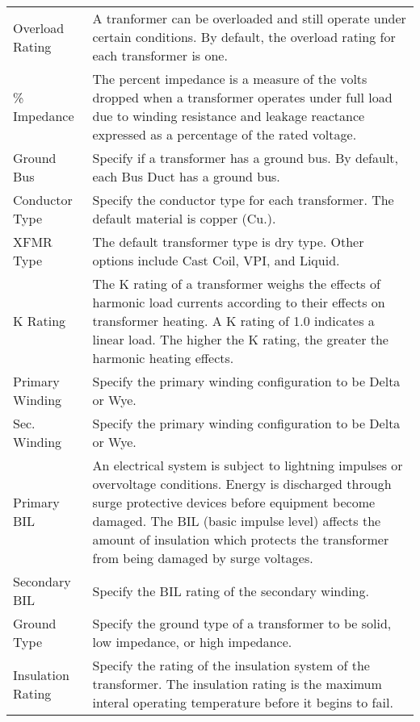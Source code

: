 \documentclass[letterpaper,10pt,english]{sphinxmanual}
\begin{document}
\begin{savenotes}\sphinxattablestart
\centering
\begin{tabulary}{\linewidth}[t]{|T|T|}
\hline
\sphinxstyletheadfamily 
{}
&\sphinxstyletheadfamily 
{}
\\
\hline
Overload Rating
&
A tranformer can be overloaded and still operate under certain conditions. By default, the overload rating for each transformer is one.
\\
\hline
\% Impedance
&
The percent impedance is a measure of the volts dropped when a transformer operates under full load due to winding resistance and leakage reactance expressed as a percentage of the rated voltage.
\\
\hline
Ground Bus
&
Specify if a transformer has a ground bus.  By default, each Bus Duct has a ground bus.
\\
\hline
Conductor Type
&
Specify the conductor type for each transformer.  The default material is copper (Cu.).
\\
\hline
XFMR Type
&
The default transformer type is dry type.  Other options include Cast Coil, VPI, and Liquid.
\\
\hline
K Rating
&
The K rating of a transformer weighs the effects of harmonic load currents according to their effects on transformer heating.  A K rating of 1.0 indicates a linear load.  The higher the K rating, the greater the harmonic heating effects.
\\
\hline
Primary Winding
&
Specify the primary winding configuration to be Delta or Wye.
\\
\hline
Sec. Winding
&
Specify the primary winding configuration to be Delta or Wye.
\\
\hline
Primary BIL
&
An electrical system is subject to lightning impulses or overvoltage conditions.  Energy is discharged through surge protective devices before equipment become damaged.
The BIL (basic impulse level) affects the amount of insulation which protects the transformer from being damaged by surge voltages.
\\
\hline
Secondary BIL
&
Specify the BIL rating of the secondary winding.
\\
\hline
Ground Type
&
Specify the ground type of a transformer to be solid, low impedance, or high impedance.
\\
\hline
Insulation Rating
&
Specify the rating of the insulation system of the transformer.  The insulation rating is the maximum interal operating temperature before it begins to fail.

\end{tabulary}
\end{savenotes}
\end{document}
